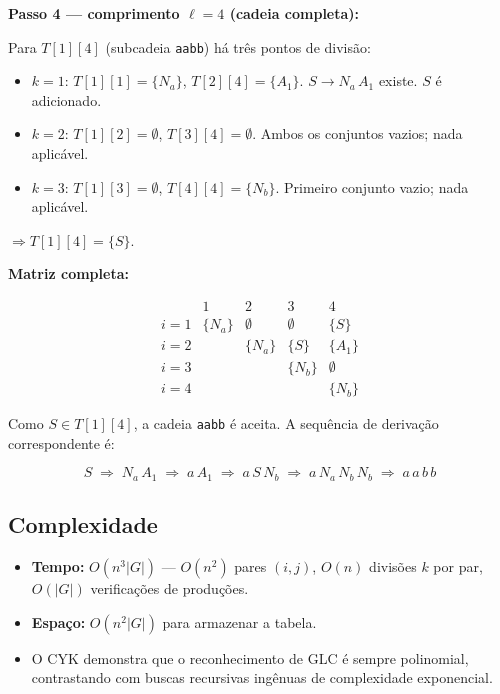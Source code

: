 \bigskip
\noindent\textbf{Passo 4 — comprimento $\ell = 4$ (cadeia completa):}

Para $T[1][4]$ (subcadeia \texttt{aabb}) há três pontos de divisão:

\begin{itemize}
  \item $k{=}1$: $T[1][1] = \{N_a\}$,\; $T[2][4] = \{A_1\}$.
        $S \to N_a\,A_1$ existe. $S$ é adicionado.
  \item $k{=}2$: $T[1][2] = \emptyset$,\; $T[3][4] = \emptyset$.
        Ambos os conjuntos vazios; nada aplicável.
  \item $k{=}3$: $T[1][3] = \emptyset$,\; $T[4][4] = \{N_b\}$.
        Primeiro conjunto vazio; nada aplicável.
\end{itemize}

$\Rightarrow T[1][4] = \{S\}$.

\medskip
\noindent\textbf{Matriz completa:}

\[
\begin{array}{c|cccc}
         & 1        & 2        & 3        & 4 \\
\hline
i{=}1 & \{N_a\}  & \emptyset & \emptyset & \{S\} \\[2pt]
i{=}2 &          & \{N_a\}   & \{S\}     & \{A_1\} \\[2pt]
i{=}3 &          &           & \{N_b\}   & \emptyset \\[2pt]
i{=}4 &          &           &           & \{N_b\}
\end{array}
\]

Como $S \in T[1][4]$, a cadeia \texttt{aabb} é aceita. A sequência de derivação correspondente é:

\[
  S \;\Rightarrow\; N_a\,A_1 \;\Rightarrow\; a\,A_1 \;\Rightarrow\; a\,S\,N_b \;\Rightarrow\; a\,N_a\,N_b\,N_b \;\Rightarrow\; a\,a\,b\,b
\]

\subsection{Complexidade}

\begin{itemize}
  \item \textbf{Tempo:} $O(n^3 |G|)$ — $O(n^2)$ pares $(i,j)$, $O(n)$ divisões $k$ por par, $O(|G|)$ verificações de produções.
  \item \textbf{Espaço:} $O(n^2 |G|)$ para armazenar a tabela.
  \item O CYK demonstra que o reconhecimento de GLC é sempre polinomial, contrastando com buscas recursivas ingênuas de complexidade exponencial.
\end{itemize}

